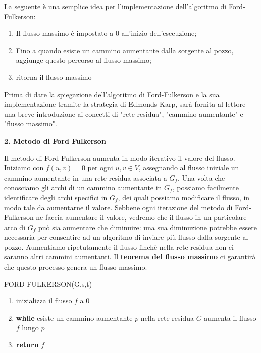 \documentclass{article}
\begin{document}
\begin{flushleft}
\normalsize 
La seguente è una semplice idea per l'implementazione dell'algoritmo di Ford-Fulkerson: 
\begin{enumerate} 
\item Il flusso massimo è impostato a 0 all'inizio dell'esecuzione;
\item Fino a quando esiste un cammino aumentante dalla sorgente al pozzo, aggiunge questo percorso al flusso massimo;
\item ritorna il flusso massimo
\end{enumerate}

Prima di dare la spiegazione dell'algoritmo di Ford-Fulkerson e la sua implementazione tramite la strategia di Edmonds-Karp, sarà fornita al lettore una breve introduzione ai concetti di "rete residua", "cammino aumentante" e "flusso massimo".
\end{flushleft}

\newpage
\begin{flushleft}
\huge \textbf{2. Metodo di Ford Fulkerson}
\newline
\newline
\normalsize


Il metodo di Ford-Fulkerson aumenta in modo iterativo il valore del flusso. Iniziamo con $f(u,v) = 0$ per ogni $u,v \in V$, assegnando al flusso iniziale un cammino aumentante in una rete residua associata a $G_f$. Una volta che conosciamo gli archi di un cammino aumentante in $G_f$, possiamo facilmente identificare degli archi specifici in $G_f$, dei quali possiamo modificare il flusso, in modo tale da aumentarne il valore. Sebbene ogni iterazione del metodo di Ford-Fulkerson ne faccia aumentare il valore, vedremo che il flusso in un particolare arco di $G_f$ può sia aumentare che diminuire: una sua diminuzione potrebbe essere necessaria per consentire ad un algoritmo di inviare più flusso dalla sorgente al pozzo.
\newline
Aumentiamo ripetutamente il flusso finchè nella rete residua non ci saranno altri cammini aumentanti. Il \textbf{teorema del flusso massimo} ci garantirà che questo processo genera un flusso massimo.
\end{flushleft}
\begin{flushleft}
FORD-FULKERSON(G,s,t)
\begin{enumerate} 
\item inizializza il flusso $f$ a 0
\item \textbf{while} esiste un cammino aumentante $p$ nella rete residua $G$ aumenta il flusso $f$ lungo $p$
\item \textbf{return} $f$
\end{enumerate}
\end{flushleft}
\end{document}
